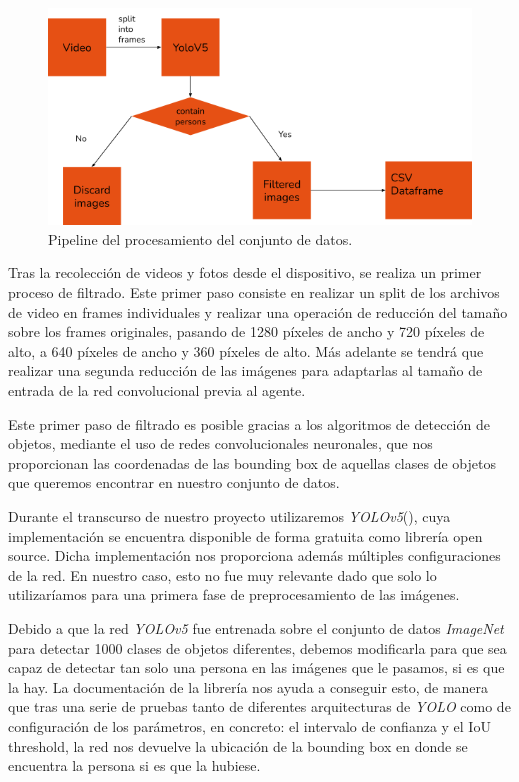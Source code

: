\begin{figure}[ht!]
    \centering
    \includegraphics[scale=0.6]{figuras/data_preprocessing.png}
    \caption[Pipeline del procesamiento del conjunto de datos]{Pipeline del procesamiento del conjunto de datos.}
    \label{fig-preprocesamiento-datos}
\end{figure}


Tras la recolección de videos y fotos desde el dispositivo, se realiza un primer proceso de filtrado. Este primer paso consiste en realizar un split de los archivos de video en frames individuales y realizar una operación de reducción del tamaño sobre los frames originales, pasando de 1280 píxeles de ancho y 720 píxeles de alto, a 640 píxeles de ancho y 360 píxeles de alto. Más adelante se tendrá que realizar una segunda reducción de las imágenes para adaptarlas al tamaño de entrada de la red convolucional previa al agente.
\medskip

Este primer paso de filtrado es posible gracias a los algoritmos de detección de objetos, mediante el uso de redes convolucionales neuronales, que nos proporcionan las coordenadas de las bounding box de aquellas clases de objetos que queremos encontrar en nuestro conjunto de datos.
\medskip

Durante el transcurso de nuestro proyecto utilizaremos \textit{YOLOv5}(\citep{youonlylookonce}), cuya implementación se encuentra disponible de forma gratuita como librería open source. Dicha implementación nos proporciona además múltiples configuraciones de la red. En nuestro caso, esto no fue muy relevante dado que solo lo utilizaríamos para una primera fase de preprocesamiento de las imágenes.
\medskip

Debido a que la red \textit{YOLOv5} fue entrenada sobre el conjunto de datos \textit{ImageNet} \citep{imagenet} para detectar 1000 clases de objetos diferentes, debemos modificarla para que sea capaz de detectar tan solo una persona en las imágenes que le pasamos, si es que la hay. La documentación de la librería nos ayuda a conseguir esto, de manera que tras una serie de pruebas tanto de diferentes arquitecturas de \textit{YOLO} como de configuración de los parámetros, en concreto: el intervalo de confianza y  el IoU threshold, la red nos devuelve la ubicación de la bounding box en donde se encuentra la persona si es que la hubiese.
\medskip


